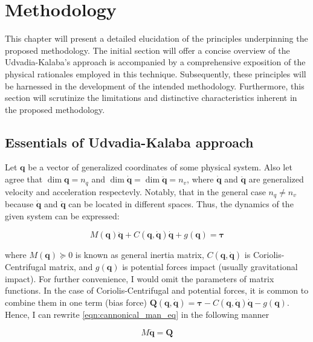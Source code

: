 \chapter{Methodology}
\label{chap:met}

This chapter will present a detailed elucidation of the principles underpinning the 
proposed methodology. The initial section will offer a concise overview of the 
Udvadia-Kalaba's approach is accompanied by a comprehensive exposition of the physical 
rationales employed in this technique. Subsequently, these principles will be 
harnessed in the development of the intended methodology. Furthermore, this section 
will scrutinize the limitations and distinctive characteristics inherent in the 
proposed methodology.

\section{Essentials of Udvadia-Kalaba approach}

Let $\mathbf{q}$ be a vector of generalized coordinates of some physical system.
Also let agree that $\dim \mathbf{q} = n_q$ and 
$\dim \dot{\mathbf{q}} = \dim \ddot{\mathbf{q}} = n_v$, where $\dot{\mathbf{q}}$ and 
$\ddot{\mathbf{q}}$ are generalized velocity and acceleration respectevly. Notably, 
that in the general case $n_q \neq n_v$ because $\dot{\mathbf{q}}$ and $\ddot{\mathbf{q}}$ 
can be located in different spaces. Thus, the dynamics of the given system can be 
expressed:

\begin{equation}
    \label{eqn:cannonical_man_eq}
    M(\mathbf{q}) \ddot{\mathbf{q}} 
    + C(\mathbf{q}, \dot{\mathbf{q}}) \dot{\mathbf{q}} 
    + g(\mathbf{q}) = \boldsymbol{\tau}
\end{equation}

where $M(\mathbf{q}) \succeq 0 $ is known as general inertia matrix, 
$C(\mathbf{q}, \dot{\mathbf{q}})$ is Coriolis-Centrifugal matrix, and 
$g(\mathbf{q})$ is potential forces impact (usually gravitational impact). 
For further convenience, I would omit the parameters of matrix functions. 
In the case of Coriolis-Centrifugal and potential forces, it is common to 
combine them in one term (bias force) $\mathbf{Q}(\mathbf{q}, \dot{\mathbf{q}}) = \boldsymbol{\tau}
- C(\mathbf{q}, \dot{\mathbf{q}}) \dot{\mathbf{q}} - g(\mathbf{q})$. Hence, I can 
rewrite \ref{eqn:cannonical_man_eq} in the following manner

\begin{equation}
    \label{eqn:compact_man_eq}
    M \ddot{\mathbf{q}} = \mathbf{Q}
\end{equation}


